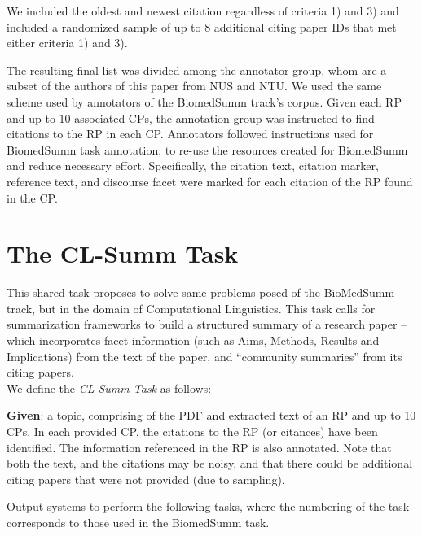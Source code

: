 \documentclass[11pt]{article}
\begin{document}
We included the oldest and newest citation regardless of criteria 1)
and 3) and included a randomized sample of up to 8 additional citing
paper IDs that met either criteria 1) and 3). 

The resulting final list was divided among the annotator group, whom
are a subset of the authors of this paper from NUS and NTU.  We used
the same scheme used by annotators of the BiomedSumm track's corpus.
Given each RP and up to 10 associated CPs, the annotation group was
instructed to find citations to the RP in each CP. Annotators followed
instructions used for BiomedSumm task annotation, to re-use the
resources created for BiomedSumm and reduce necessary effort.
Specifically, the citation text, citation marker, reference text, and
discourse facet were marked for each citation of the RP found in the
CP.


\section{The CL-Summ Task}
This shared task proposes to solve same problems posed of the
BioMedSumm track, but in the domain of Computational Linguistics. This
task calls for summarization frameworks to build a structured summary
of a research paper -- which incorporates facet information (such as
Aims, Methods, Results and Implications) from the text of the paper,
and ``community summaries'' from its citing papers. \\

\noindent We define the {\it CL-Summ Task} as follows:

{\bf Given}: a topic, comprising of the PDF and extracted text of an RP and
up to 10 CPs.  In each provided CP, the citations to the RP (or
citances) have been identified. The information referenced in the RP
is also annotated.  Note that both the text, and the citations may be
noisy, and that there could be additional citing papers that were not
provided (due to sampling).

Output systems to perform the following tasks, where the numbering of
the task corresponds to those used in the BiomedSumm task.
\end{document}
